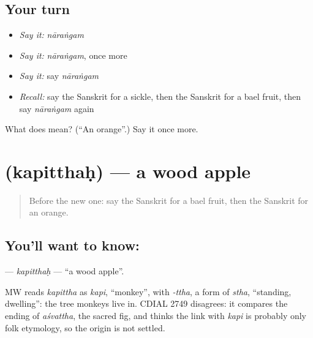 \subsection*{Your turn}
\begin{itemize}
\raggedright
  \item \emph{Say it:} \emph{nāraṅgam}
  \item \emph{Say it:} \emph{nāraṅgam}, once more
  \item \emph{Say it:} say \emph{nāraṅgam}
  \item \emph{Recall:} say the Sanskrit for a sickle, then the Sanskrit for a bael fruit, then say \emph{nāraṅgam} again
\end{itemize}

\begin{tcolorbox}[breakable,colback=teal!4,colframe=teal!35!black,title={Before you move on}]
What does  mean? (\textquotedblleft{}An orange\textquotedblright{}.) Say it once more.
\end{tcolorbox}
\section[\texorpdfstring{\sk{कपित्थः} (kapitthaḥ)}{कपित्थः (kapitthaḥ)}]{ (kapitthaḥ) — a wood apple}

\label{lesson:SA-C219-kapitthah}



\begin{quote}
Before the new one: say the Sanskrit for a bael fruit, then the Sanskrit for an orange.
\end{quote}

\subsection*{You'll want to know: }
\textbf{} — \emph{kapitthaḥ} — \textquotedblleft{}a wood apple\textquotedblright{}.

\begin{cousinweb}
MW reads \emph{kapittha} as \emph{kapi}, \textquotedblleft{}monkey\textquotedblright{}, with \emph{-ttha}, a form of \emph{stha}, \textquotedblleft{}standing, dwelling\textquotedblright{}: the tree monkeys live in. CDIAL 2749 disagrees: it compares the ending of \emph{aśvattha}, the sacred fig, and thinks the link with \emph{kapi} is probably only folk etymology, so the origin is not settled.
\end{cousinweb}

